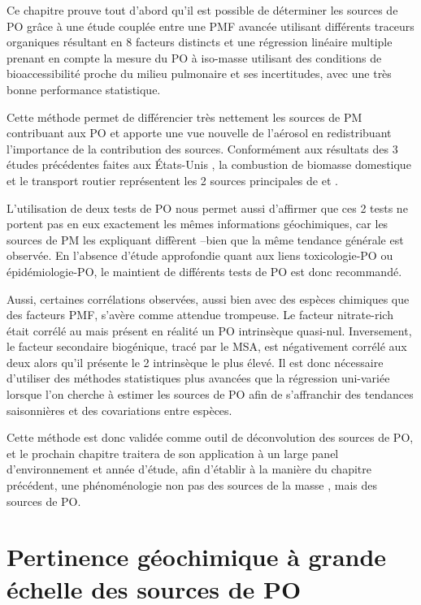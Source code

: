 Ce chapitre prouve tout d'abord qu'il est possible de déterminer les sources de PO grâce à
une étude couplée entre une PMF avancée utilisant différents traceurs organiques résultant
en 8 facteurs distincts et une régression linéaire multiple prenant en compte
la mesure du PO à iso-masse utilisant des conditions de bioaccessibilité proche du milieu
pulmonaire et ses incertitudes, avec une très bonne performance statistique.

Cette méthode permet de différencier très nettement les sources de PM contribuant aux PO
et apporte une vue nouvelle de l'aérosol en redistribuant l'importance de la contribution
des sources. Conformément aux résultats des 3 études précédentes faites aux États-Unis
\autocite{vermaReactive2014,batesReactive2015,fangOxidative2016}, la combustion de
biomasse domestique et le transport routier représentent les 2 sources principales de
\POAAv{} et \PODTTv.

L'utilisation de deux tests de PO nous permet aussi d'affirmer que ces 2 tests ne portent
pas en eux exactement les mêmes informations géochimiques, car les sources de PM les
expliquant diffèrent --bien que la même tendance générale est observée. En l'absence
d'étude approfondie quant aux liens toxicologie-PO ou épidémiologie-PO, le maintient de
différents tests de PO est donc recommandé.

Aussi, certaines corrélations observées, aussi bien avec des espèces chimiques que des
facteurs PMF, s'avère comme attendue trompeuse. Le facteur nitrate-rich était corrélé au
\POAAv{} mais présent en réalité un PO intrinsèque quasi-nul. Inversement, le facteur
secondaire biogénique, tracé par le MSA, est négativement corrélé aux deux \OPv{} alors
qu'il présente le 2\ieme{} \PODTT{} intrinsèque le plus élevé. Il est donc nécessaire
d'utiliser des méthodes statistiques plus avancées que la régression uni-variée lorsque
l'on cherche à estimer les sources de PO afin de s'affranchir des tendances saisonnières et
des covariations entre espèces.

Cette méthode est donc validée comme outil de déconvolution des sources de PO, et le
prochain chapitre traitera de son application à un large panel d'environnement et année
d'étude, afin d'établir à la manière du chapitre précédent, une phénoménologie non pas des
sources de la masse \PMdix, mais des sources de PO.


\section{Pertinence géochimique à grande échelle des sources de PO}%
\label{sec:synthèse_grande_échelle}

